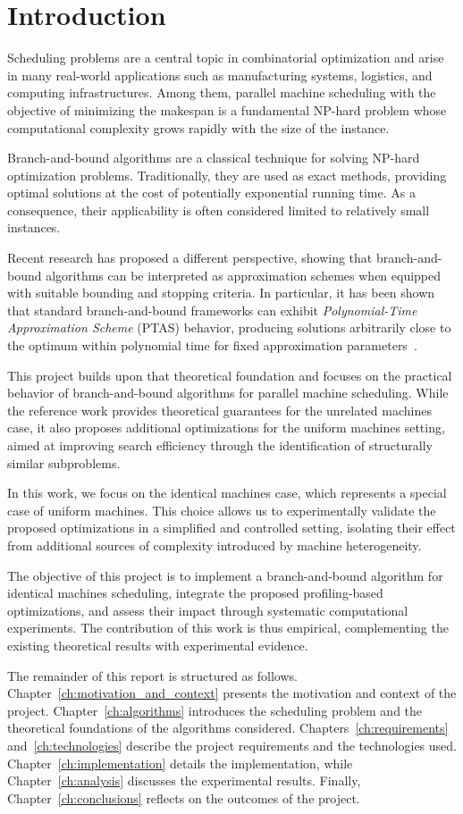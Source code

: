 \chapter{Introduction}
\label{ch:introduction}

Scheduling problems are a central topic in combinatorial optimization and arise in many real-world applications such as manufacturing systems, logistics, and computing infrastructures.
Among them, parallel machine scheduling with the objective of minimizing the makespan is a fundamental NP-hard problem whose computational complexity grows rapidly with the size of the instance.

Branch-and-bound algorithms are a classical technique for solving NP-hard optimization problems.
Traditionally, they are used as exact methods, providing optimal solutions at the cost of potentially exponential running time.
As a consequence, their applicability is often considered limited to relatively small instances.

Recent research has proposed a different perspective, showing that branch-and-bound algorithms can be interpreted as approximation schemes when equipped with suitable bounding and stopping criteria.
In particular, it has been shown that standard branch-and-bound frameworks can exhibit \emph{Polynomial-Time Approximation Scheme} (PTAS) behavior, producing solutions arbitrarily close to the optimum within polynomial time for fixed approximation parameters~\cite{bb-ptas}.

This project builds upon that theoretical foundation and focuses on the practical behavior of branch-and-bound algorithms for parallel machine scheduling.
While the reference work provides theoretical guarantees for the unrelated machines case, it also proposes additional optimizations for the uniform machines setting, aimed at improving search efficiency through the identification of structurally similar subproblems.

In this work, we focus on the identical machines case, which represents a special case of uniform machines.
This choice allows us to experimentally validate the proposed optimizations in a simplified and controlled setting, isolating their effect from additional sources of complexity introduced by machine heterogeneity.

The objective of this project is to implement a branch-and-bound algorithm for identical machines scheduling, integrate the proposed profiling-based optimizations, and assess their impact through systematic computational experiments.
The contribution of this work is thus empirical, complementing the existing theoretical results with experimental evidence.

The remainder of this report is structured as follows.
Chapter~\ref{ch:motivation_and_context} presents the motivation and context of the project.
Chapter~\ref{ch:algorithms} introduces the scheduling problem and the theoretical foundations of the algorithms considered.
Chapters~\ref{ch:requirements} and~\ref{ch:technologies} describe the project requirements and the technologies used.
Chapter~\ref{ch:implementation} details the implementation, while Chapter~\ref{ch:analysis} discusses the experimental results.
Finally, Chapter~\ref{ch:conclusions} reflects on the outcomes of the project.